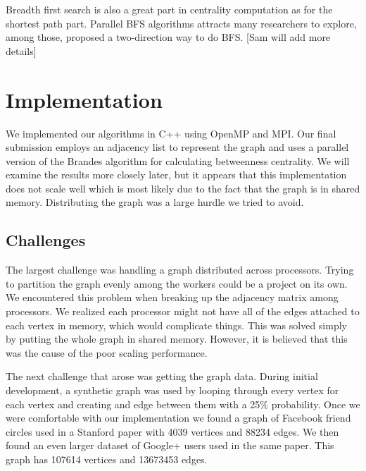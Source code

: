 \documentclass[11pt,a4paper,titlepage]{article}
\begin{document}
Breadth first search is also a great part in centrality computation as for the
shortest path part. Parallel BFS algorithms attracts many researchers to
explore, among those, \cite{beamer2013direction} proposed a two-direction way
to do BFS. [Sam will add more details]



\section{Implementation} %
\label{sec:data}

We implemented our algorithms in C++ using OpenMP and MPI. Our final submission
employs an adjacency list to represent the graph and uses a parallel version
of the Brandes algorithm for calculating betweenness centrality. We will
examine the results more closely later, but it appears that this implementation
does not scale well which is most likely due to the fact that the graph is in
shared memory. Distributing the graph was a large hurdle we tried to avoid.


\subsection{Challenges}

The largest challenge was handling a graph distributed across processors.
Trying to partition the graph evenly among the workers could be a project on
its own. We encountered this problem when breaking up the adjacency matrix
among processors. We realized each processor might not have all of the edges
attached to each vertex in memory, which would complicate things. This was
solved simply by putting the whole graph in shared memory. However, it is
believed that this was the cause of the poor scaling performance.

The next challenge that arose was getting the graph data. During initial
development, a synthetic graph was used by looping through every vertex for
each vertex and creating and edge between them with a 25\% probability. Once we
were comfortable with our implementation we found a graph of Facebook friend
circles used in a Stanford paper \cite{leskovec2012learning} with 4039 vertices
and 88234 edges. We then found an even larger dataset of Google+ users used in
the same paper. This graph has 107614 vertices and 13673453 edges.
\end{document}
